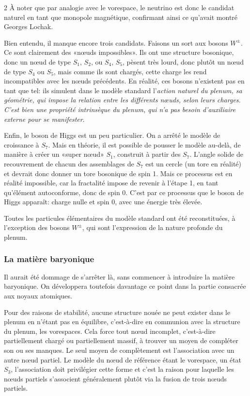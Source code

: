 \begin{multicols}{2}
À noter que par analogie avec le vorespace, le neutrino est donc le
candidat naturel en tant que monopole magnétique, confirmant ainsi ce
qu'avait montré Georges Lochak. \cite{lochak2002monopole}
\medskip

Bien entendu, il manque encore trois candidats. Faisons un sort aux
bosons $W^{\pm}$. Ce sont clairement des «nœuds impossibles». Ils ont une structure
bosonique, donc un nœud de type $S_1$, $S_2$, ou $S_4$, $S_5$, pèsent très
lourd, donc plutôt un nœud de type $S_4$ ou $S_5$, mais comme ils sont chargés, cette charge 
les rend incompatibles avec les nœuds précédents. En réalité, ces bosons
n'existent pas en tant que tel: ils simulent dans le modèle standard
l'\textit{action naturel du plenum, sa géométrie, qui impose la relation entre
les différents nœuds, selon leurs charges. C'est bien une propriété
intrinsèque du plenum, qui n'a pas besoin d'auxiliaire externe pour se
manifester}.

Enfin, le boson de Higgs est un peu particulier. On a arrêté le modèle
de croissance à $S_7$. Mais en théorie, il est possible de pousser le
modèle au-delà, de manière à créer un «super nœud» $S_1$, construit à partir
des $S_7$. L'angle solide de recouvrement de chacun des assemblages de
$S_7$ est un cercle (un tore en réalité) et devrait donc donner un tore
bosonique de spin 1. Mais ce processus est en réalité impossible, car
la fractalité impose de revenir à l'étape 1, en tant qu'élément
autoconforme, donc de spin 0. C'est par ce processus que le boson de
Higgs apparaît: charge nulle et spin 0, avec une énergie très élevée.

Toutes les particules élémentaires du modèle standard ont été
reconstituées, à l'exception des bosons $W^\pm$, qui sont l'expression de
la nature profonde du plenum.

\subsubsection{La matière baryonique}

Il aurait été dommage de s'arrêter là, sans commencer à introduire la
matière baryonique. On développera toutefois davantage ce point dans
la partie consacrée aux noyaux atomiques.

Pour des raisons de stabilité, aucune structure nouée ne peut exister
dans le plenum en n'étant pas en équilibre, c'est-à-dire en communion
avec la structure du plenum, les vorespaces. Cela force tout nœud
incomplet, c'est-à-dire partiellement chargé ou partiellement
massif, à trouver un moyen de compléter son ou ses manques. Le seul moyen
de complètement est l'association avec un autre nœud partiel. Le modèle du
nœud de référence étant le vorespace, un état $S_3$, l'association doit
privilégier cette forme et c'est la raison pour laquelle les nœuds
partiels s'associent généralement plutôt via la fusion de trois nœuds
partiels.


\end{multicols}
